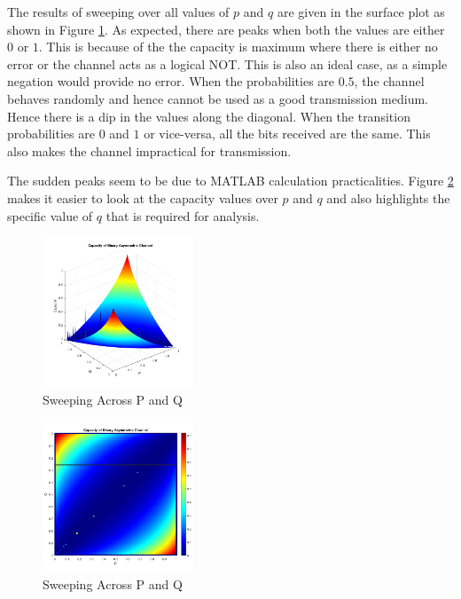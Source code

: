 The results of sweeping over all values of $p$ and $q$ are given in the surface plot as shown in Figure \ref{fig:allpq3d}. As expected, there are peaks when both the values are either $0$ or $1$. This is because of the the capacity is maximum where there is either no error or the channel acts as a logical NOT. This is also an ideal case, as a simple negation would provide no error. When the probabilities are $0.5$, the channel behaves randomly and hence cannot be used as a good transmission medium. Hence there is a dip in the values along the diagonal. When the transition probabilities are $0$ and $1$ or vice-versa, all the bits received are the same. This also makes the channel impractical for transmission.

The sudden peaks seem to be due to MATLAB calculation practicalities. Figure \ref{fig:allpq2d} makes it easier to look at the capacity values over $p$ and $q$ and also highlights the specific value of $q$ that is required for analysis.

\begin{figure}[h!]
    \centering
    \includegraphics[width=0.4\textwidth]{images/allq1.png}
    \caption{Sweeping Across P and Q}
    \label{fig:allpq3d}
\end{figure}

\begin{figure}[h!]
    \centering
    \includegraphics[width=0.4\textwidth]{images/allq2.png}
    \caption{Sweeping Across P and Q}
    \label{fig:allpq2d}
\end{figure}

